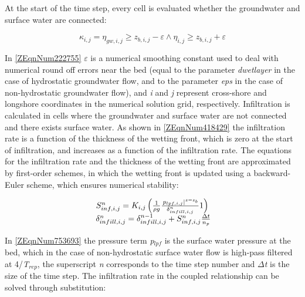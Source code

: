 \documentclass{article}
\begin{document}
\noindent 

\noindent At the start of the time step, every cell is evaluated whether the groundwater and surface water are connected:

\noindent 
\begin{equation} \label{ZEqnNum222755} 
\kappa _{i,j} =\eta _{gw,i,j} \ge z_{b,i,j} -\varepsilon \wedge \eta _{i,j} \ge z_{b,i,j} +\varepsilon  
\end{equation} 


\noindent In \eqref{ZEqnNum222755} \textit{$\varepsilon $} is a numerical smoothing constant used to deal with numerical round off errors near the bed (equal to the parameter \textit{dwetlayer} in the case of hydrostatic groundwater flow, and to the parameter \textit{eps} in the case of non-hydrostatic groundwater flow), and \textit{i} and \textit{j} represent cross-shore and longshore coordinates in the numerical solution grid, respectively. Infiltration is calculated in cells where the groundwater and surface water are not connected and there exists surface water. As shown in \eqref{ZEqnNum418429} the infiltration rate is a function of the thickness of the wetting front, which is zero at the start of infiltration, and increases as a function of the infiltration rate. The equations for the infiltration rate and the thickness of the wetting front are approximated by first-order schemes, in which the wetting front is updated using a backward-Euler scheme, which ensures numerical stability:

\noindent 
\begin{equation} \label{ZEqnNum753693} 
\begin{array}{c} {S_{inf,i,j}^{n} =K_{i,j} \left(\frac{1}{\rho g} \frac{\left. p_{lpf,i,j} \right|^{z=z_{b} } }{\delta _{infill,i,j}^{n} } 1\right)} \\ {{\rm \; }\delta _{infill,i,j}^{n} =\delta _{infill,i,j}^{n-1} +S_{inf,i,j}^{n} \frac{\Delta t}{n_{p} } } \end{array} 
\end{equation} 


\noindent In \eqref{ZEqnNum753693} the pressure term \textit{p${}_{lpf}$}  is the surface water pressure at the bed, which in the case of non-hydrostatic surface water flow is high-pass filtered at 4/\textit{T${}_{rep}$}, the superscript \textit{n} corresponds to the time step number and\textit{ $\Delta $t }is the size of the time step. The infiltration rate in the coupled relationship can be solved through substitution:
\end{document}
